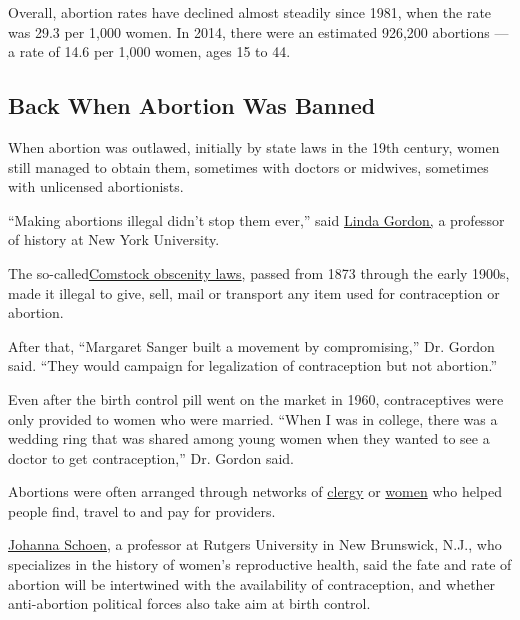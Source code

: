 Overall, abortion rates have declined almost steadily since 1981, when
the rate was 29.3 per 1,000 women. In 2014, there were an estimated
926,200 abortions --- a rate of 14.6 per 1,000 women, ages 15 to 44.

\hypertarget{back-when-abortion-was-banned}{%
\subsection{Back When Abortion Was
Banned}\label{back-when-abortion-was-banned}}

When abortion was outlawed, initially by state laws in the 19th century,
women still managed to obtain them, sometimes with doctors or midwives,
sometimes with unlicensed abortionists.

``Making abortions illegal didn't stop them ever,'' said
\href{https://as.nyu.edu/history/people.linda-gordon.html}{Linda
Gordon,} a professor of history at New York University.

The
so-called\href{https://www.pbs.org/wgbh/americanexperience/features/pill-anthony-comstocks-chastity-laws/}{Comstock
obscenity laws}, passed from 1873 through the early 1900s, made it
illegal to give, sell, mail or transport any item used for contraception
or abortion.

After that, ``Margaret Sanger built a movement by compromising,'' Dr.
Gordon said. ``They would campaign for legalization of contraception but
not abortion.''

Even after the birth control pill went on the market in 1960,
contraceptives were only provided to women who were married. ``When I
was in college, there was a wedding ring that was shared among young
women when they wanted to see a doctor to get contraception,'' Dr.
Gordon said.

Abortions were often arranged through networks of
\href{https://www.npr.org/2017/05/19/529175737/50-years-ago-a-network-of-clergy-helped-women-seeking-abortion}{clergy}
or \href{https://www.cwluherstory.org/jane-stories-articles/}{women} who
helped people find, travel to and pay for providers.

\href{http://www.ihhcpar.rutgers.edu/about_us/members.asp?v=2\&i=726}{Johanna
Schoen}, a professor at Rutgers University in New Brunswick, N.J., who
specializes in the history of women's reproductive health, said the fate
and rate of abortion will be intertwined with the availability of
contraception, and whether anti-abortion political forces also take aim
at birth control.

